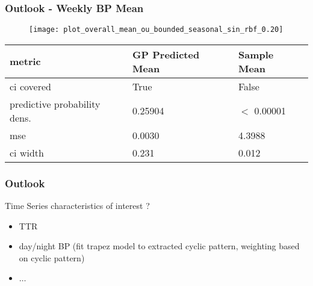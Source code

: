 \documentclass[
	8pt, %
]{beamer}
\begin{document}
\begin{frame}
	\frametitle{Outlook - Weekly BP Mean}
	\begin{figure}
		\texttt{[image: plot\_overall\_mean\_ou\_bounded\_seasonal\_sin\_rbf\_0.20]}
	\end{figure}


	\begin{table}
		\begin{tabular}{l l l}
			\toprule
			\textbf{metric} & \textbf{GP Predicted Mean} & \textbf{Sample Mean}\\
			\midrule
			ci covered & True & False \\
			predictive probability dens. & 0.25904 & $<$ 0.00001 \\
			mse & 0.0030 & 4.3988 \\
			ci width &  0.231 & 0.012 \\
			\bottomrule
		\end{tabular}


	\end{table}


\end{frame}


\begin{frame}
	\frametitle{Outlook}

	Time Series characteristics of interest ?
	\begin{itemize}
		\item TTR
		\item day/night BP (fit trapez model to extracted cyclic pattern, weighting based on cyclic pattern)
		\item $\dots$
	\end{itemize}

\end{frame}
\end{document}
